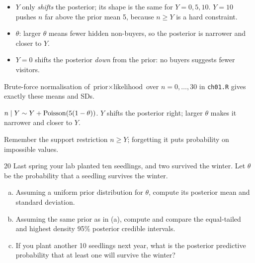 \documentclass[11pt]{article}
\begin{document}
\begin{itemize}
\item \textbf{$Y$} only \emph{shifts} the posterior; its shape is the same for $Y=0,5,10$. $Y=10$ pushes $n$ far above the prior mean 5, because $n\ge Y$ is a hard constraint.
\item \textbf{$\theta$}: larger $\theta$ means fewer hidden non-buyers, so the posterior is narrower and closer to $Y$.
\item $Y=0$ shifts the posterior \emph{down} from the prior: no buyers suggests fewer visitors.
\end{itemize}

\begin{sanity}
Brute-force normalisation of $\text{prior}\times\text{likelihood}$ over $n=0,\dots,30$ in \texttt{ch01.R} gives exactly these means and SDs. \checkmark
\end{sanity}

\begin{answer}
$n\mid Y\sim Y+\mathrm{Poisson}(5(1-\theta))$. $Y$ shifts the posterior right; larger $\theta$ makes it narrower and closer to $Y$.
\end{answer}

\begin{takeaway}
Remember the support restriction $n\ge Y$; forgetting it puts probability on impossible values.
\end{takeaway}


\begin{problem}{20}
Last spring your lab planted ten seedlings, and two survived the winter. Let $\theta$ be the probability that a seedling survives the winter.
\begin{enumerate}[(a)]
\item Assuming a uniform prior distribution for $\theta$, compute its posterior mean and standard deviation.
\item Assuming the same prior as in (a), compute and compare the equal-tailed and highest density 95\% posterior credible intervals.
\item If you plant another 10 seedlings next year, what is the posterior predictive probability that at least one will survive the winter?
\end{enumerate}
\end{problem}
\end{document}
